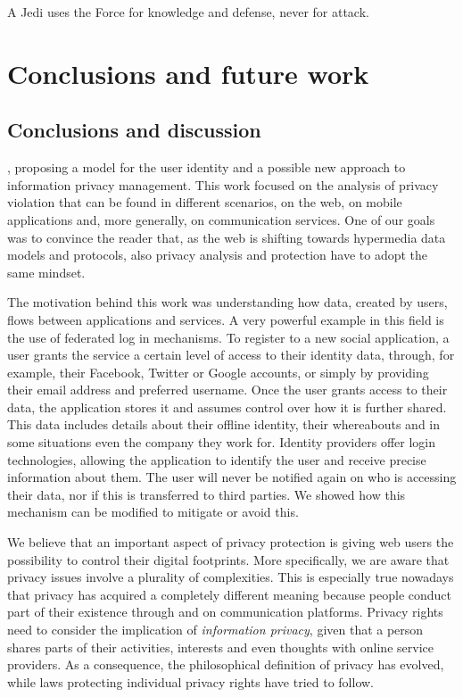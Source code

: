 \begin{savequote}[75mm] 
A Jedi uses the Force for knowledge and defense, never for attack.
\end{savequote}

\chapter{Conclusions and future work}

\section{Conclusions and discussion}

, proposing a model for the user identity and a possible new approach to information privacy management. This work focused on the analysis of privacy violation that can be found in different scenarios, on the web, on mobile applications and, more generally, on communication services.
One of our goals was to convince the reader that, as the web is shifting towards hypermedia data models and protocols, also privacy analysis and protection have to adopt the same mindset.

The motivation behind this work was understanding how data, created by users, flows between applications and services. A very powerful example in this field is the use of federated log in mechanisms. To register to a new social application, a user grants the service a certain level of access to their identity data, through, for example, their Facebook, Twitter or Google accounts, or simply by providing their email address and preferred username. Once the user grants access to their data, the application stores it and assumes control over how it is further shared. This data includes details about their offline identity, their whereabouts and in some situations even the company they work for. Identity providers offer login technologies, allowing the application to identify the user and receive precise information about them. The user will never be notified again on who is accessing their data, nor if this is transferred to third parties. We showed how this mechanism can be modified to mitigate or avoid this.

We believe that an important aspect of privacy protection is giving web users the possibility to control their digital footprints. More specifically, we are aware that privacy issues involve a plurality of complexities. This is especially true nowadays that privacy has acquired a completely different meaning because people conduct part of their existence through and on communication platforms. Privacy rights need to consider the implication of \emph{information privacy}, given that a person shares parts of their activities, interests and even thoughts with online service providers. As a consequence, the philosophical definition of privacy has evolved, while laws protecting individual privacy rights have tried to follow.

